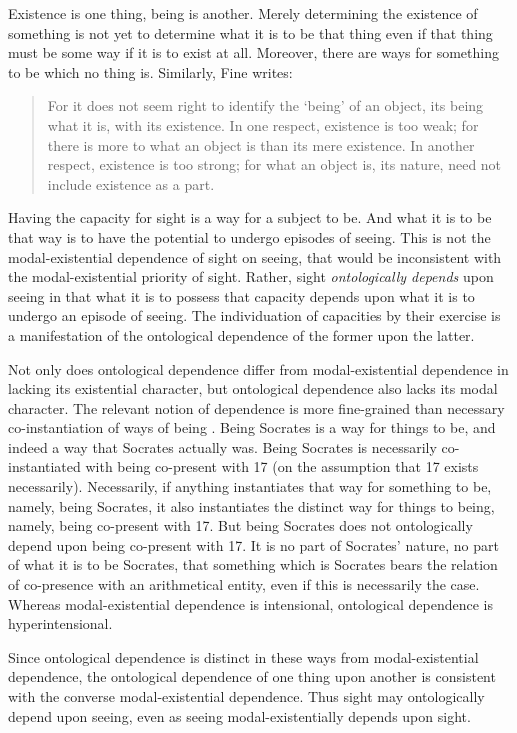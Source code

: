 \documentclass[12pt]{article}
\begin{document}
Existence is one thing, being is another. Merely determining the existence of something is not yet to determine what it is to be that thing even if that thing must be some way if it is to exist at all. Moreover, there are ways for something to be which no thing is. Similarly, Fine writes:
\begin{quote}
	For it does not seem right to identify the `being' of an object, its being what it is, with its existence. In one respect, existence is too weak; for there is more to what an object is than its mere existence. In another respect, existence is too strong; for what an object is, its nature, need not include existence as a part. \citep[274]{Fine:1995ls}
\end{quote}
Having the capacity for sight is a way for a subject to be. And what it is to be that way is to have the potential to undergo episodes of seeing. This is not the modal-existential dependence of sight on seeing, that would be inconsistent with the modal-existential priority of sight. Rather, sight \emph{ontologically depends} upon seeing in that what it is to possess that capacity depends upon what it is to undergo an episode of seeing. The individuation of capacities by their exercise is a manifestation of the ontological dependence of the former upon the latter.

Not only does ontological dependence differ from modal-existential dependence in lacking its existential character, but ontological dependence also lacks its modal character. The relevant notion of dependence is more fine-grained than necessary co-instantiation of ways of being \citep[see][]{Fine:1994uq,Fine:1995ls,Schaffer:2009vn,Rosen:2010kx}. Being Socrates is a way for things to be, and indeed a way that Socrates actually was. Being Socrates is necessarily co-instantiated with being co-present with 17 (on the assumption that 17 exists necessarily). Necessarily, if anything instantiates that way for something to be, namely, being Socrates, it also instantiates the distinct way for things to being, namely, being co-present with 17. But being Socrates does not ontologically depend upon being co-present with 17. It is no part of Socrates' nature, no part of what it is to be Socrates, that something which is Socrates bears the relation of co-presence with an arithmetical entity, even if this is necessarily the case. Whereas modal-existential dependence is intensional, ontological dependence is hyperintensional.

Since ontological dependence is distinct in these ways from modal-existential dependence, the ontological dependence of one thing upon another is consistent with the converse modal-existential dependence. Thus sight may ontologically depend upon seeing, even as seeing modal-existentially depends upon sight. 
\end{document}
